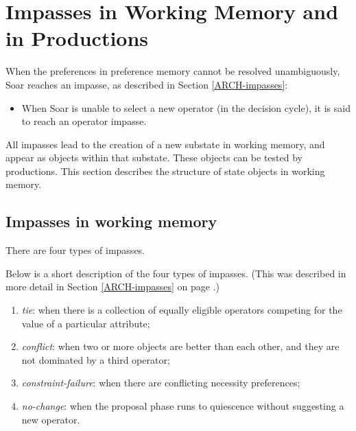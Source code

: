 \section{Impasses in Working Memory and in Productions}
\label{SYNTAX-impasses}

When the preferences in preference memory cannot be resolved unambiguously,
Soar reaches an impasse, as described in Section \ref{ARCH-impasses}:
\vspace{-12pt}
\begin{itemize}
\item When Soar is unable to select a new operator (in the decision cycle), it
        is said to reach an operator impasse.
\end{itemize}\vspace{-8pt}

All impasses lead to the creation of a new substate in working memory, and appear 
as objects within that substate. These objects can be tested by productions.
This section describes the structure of state objects in working memory.

\subsection{Impasses in working memory}
\label{SYNTAX-impasseaug}       %

There are four types of impasses. 

Below is a short description of the four types of impasses. (This was
described in more detail in Section \ref{ARCH-impasses} on page
\pageref{ARCH-impasses}.)

\vspace{-12pt}
\begin{enumerate}
\item \emph{tie}: when there is a collection of equally eligible operators
        competing for the value of a particular attribute;\vspace{-8pt}
\item \emph{conflict}: when two or more objects are better than each other,
        and they are not dominated by a third operator;\vspace{-8pt}
\item \emph{constraint-failure}: when there are conflicting necessity
        preferences; \vspace{-8pt}
\item \emph{no-change}: when the proposal phase runs to quiescence without 
        suggesting a new operator.
\end{enumerate}

